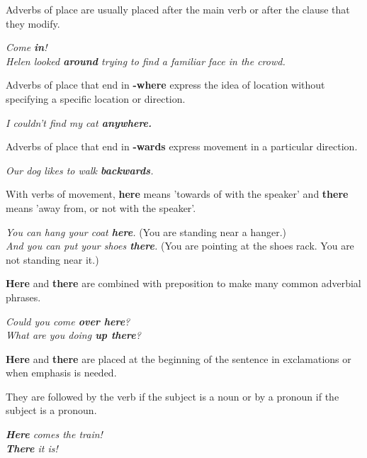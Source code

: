 \documentclass[hidelinks,10pt,a4paper]{article}
\begin{document}
Adverbs of place are usually placed after the main verb or after the clause that they modify.

\begin{center}
	\textit{Come \textbf{in}!}\\
	\textit{Helen looked \textbf{around} trying to find a familiar face in the crowd.}
\end{center}

Adverbs of place that end in \textbf{-where} express the idea of location without specifying a specific location or direction.

\begin{center}
	\textit{I couldn't find my cat \textbf{anywhere.}}
\end{center}

Adverbs of place that end in \textbf{-wards} express movement in a particular direction.

\begin{center}
	\textit{Our dog likes to walk \textbf{backwards}.}
\end{center}

With verbs of movement, \textbf{here} means 'towards of with the speaker' and \textbf{there} means 'away from, or not with the speaker'.

\begin{center}
	\textit{You can hang your coat \textbf{here}.} (You are standing near a hanger.)\\
	\textit{And you can put your shoes \textbf{there}.} (You are pointing at the shoes rack. You are not standing near it.)
\end{center}

\textbf{Here} and \textbf{there} are combined with preposition to make many common adverbial phrases.

\begin{center}
	\textit{Could you come \textbf{over here}?\\
	What are you doing \textbf{up there}?}
\end{center}

\textbf{Here} and \textbf{there} are placed at the beginning of the sentence in exclamations or when emphasis is needed.

They are followed by the verb if the subject is a noun or by a pronoun if the subject is a pronoun.

\begin{center}
	\textit{\textbf{Here} comes the train!\\
	\textbf{There} it is! }
\end{center}
\end{document}

